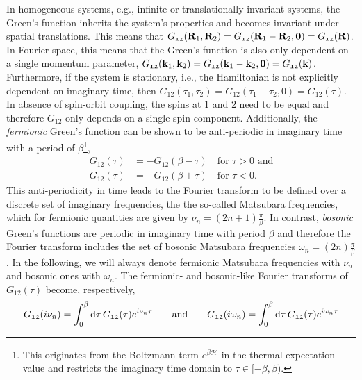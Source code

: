 \documentclass[../../main.tex]{subfiles}
\begin{document}
In homogeneous systems, e.g., infinite or translationally invariant systems, the Green's function inherits the system's properties and becomes invariant under spatial translations. This means that $G_{\mathfrak{12}}(\textbf{R}_1, \textbf{R}_2)=G_{\mathfrak{12}}(\textbf{R}_1-\textbf{R}_2,\textbf{0})=G_{\mathfrak{12}}(\textbf{R})$. In Fourier space, this means that the Green's function is also only dependent on a single momentum parameter, $G_{\mathfrak{12}}(\textbf{k}_1, \textbf{k}_2)=G_{\mathfrak{12}}(\textbf{k}_1-\textbf{k}_2,\textbf{0})=G_{\mathfrak{12}}(\textbf{k})$. Furthermore, if the system is stationary, i.e., the Hamiltonian is not explicitly dependent on imaginary time, then $G_{\mathfrak{12}}(\tau_1, \tau_2)=G_{\mathfrak{12}}(\tau_1-\tau_2,0)=G_{\mathfrak{12}}(\tau)$. In absence of spin-orbit coupling, the spins at $\mathfrak{1}$ and $\mathfrak{2}$ need to be equal and therefore $G_{\mathfrak{12}}$ only depends on a single spin component. Additionally, the \textit{fermionic} Green's function can be shown to be anti-periodic in imaginary time with a period of $\beta$\footnote{This originates from the Boltzmann term $e^{\beta\hat{\mathcal{H}}}$ in the thermal expectation value and restricts the imaginary time domain to $\tau\in[-\beta,\beta)$.},
\begin{subequations}
\begin{align}
	G_{\mathfrak{12}}(\tau)&=-G_{\mathfrak{12}}(\beta-\tau)\quad\text{for } \tau>0 \text{ and}\\
	G_{\mathfrak{12}}(\tau)&=-G_{\mathfrak{12}}(\beta+\tau)\quad\text{for } \tau<0.
\end{align}
\end{subequations}
This anti-periodicity in time leads to the Fourier transform to be defined over a discrete set of imaginary frequencies, the the so-called Matsubara frequencies, which for fermionic quantities are given by $\nu_n=(2n+1)\frac\pi\beta$. In contrast, \textit{bosonic} Green's functions are periodic in imaginary time with period $\beta$ and therefore the Fourier transform includes the set of bosonic Matsubara frequencies $\omega_n=(2n)\frac\pi\beta$. In the following, we will always denote fermionic Matsubara frequencies with $\nu_n$ and bosonic ones with $\omega_n$. The fermionic- and bosonic-like Fourier transforms of $G_{\mathfrak{12}}(\tau)$ become, respectively,
\begin{align}
	G_{\mathfrak{12}}(i\nu_n)=\int_{0}^{\beta}\text{d}\tau\,G_{\mathfrak{12}}(\tau) e^{i\nu_n\tau} \qquad\text{and}\qquad G_{\mathfrak{12}}(i\omega_n)=\int_{0}^{\beta}\text{d}\tau\,G_{\mathfrak{12}}(\tau) e^{i\omega_n\tau}
\end{align}
\end{document}

